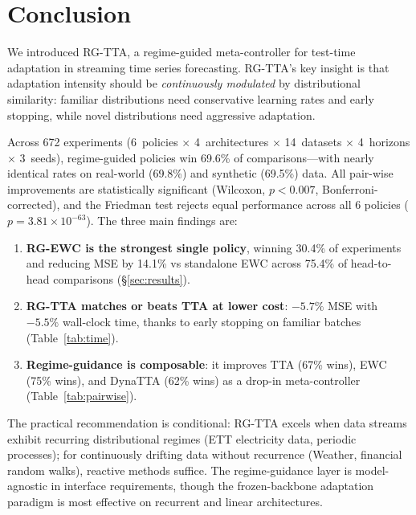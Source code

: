 \documentclass[11pt,a4paper]{article}
\begin{document}
\section{Conclusion}
\label{sec:conclusion}

We introduced RG-TTA, a regime-guided meta-controller for test-time adaptation in streaming time series forecasting. RG-TTA's key insight is that adaptation intensity should be \emph{continuously modulated} by distributional similarity: familiar distributions need conservative learning rates and early stopping, while novel distributions need aggressive adaptation.

Across 672 experiments (6~policies $\times$ 4~architectures $\times$ 14~datasets $\times$ 4~horizons $\times$ 3~seeds), regime-guided policies win 69.6\% of comparisons---with nearly identical rates on real-world (69.8\%) and synthetic (69.5\%) data. All pair-wise improvements are statistically significant (Wilcoxon, $p < 0.007$, Bonferroni-corrected), and the Friedman test rejects equal performance across all 6 policies ($p = 3.81 \times 10^{-63}$). The three main findings are:

\begin{enumerate}[nosep]
  \item \textbf{RG-EWC is the strongest single policy}, winning 30.4\% of experiments and reducing MSE by 14.1\% vs standalone EWC across 75.4\% of head-to-head comparisons (\S\ref{sec:results}).
  \item \textbf{RG-TTA matches or beats TTA at lower cost}: $-5.7\%$ MSE with $-5.5\%$ wall-clock time, thanks to early stopping on familiar batches (Table~\ref{tab:time}).
  \item \textbf{Regime-guidance is composable}: it improves TTA (67\% wins), EWC (75\% wins), and DynaTTA (62\% wins) as a drop-in meta-controller (Table~\ref{tab:pairwise}).
\end{enumerate}

The practical recommendation is conditional: RG-TTA excels when data streams exhibit recurring distributional regimes (ETT electricity data, periodic processes); for continuously drifting data without recurrence (Weather, financial random walks), reactive methods suffice. The regime-guidance layer is model-agnostic in interface requirements, though the frozen-backbone adaptation paradigm is most effective on recurrent and linear architectures.
\end{document}
